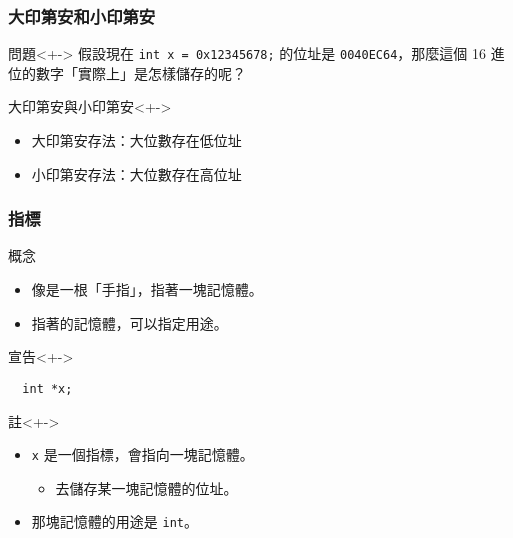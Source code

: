 \documentclass[utf8]{beamer}
\begin{document}
\begin{CJK}{UTF8}{bkai}
\begin{frame}[fragile]
  \frametitle{大印第安和小印第安}
  \begin{block}{問題}<+->
  假設現在 \lstinline{int x = 0x12345678;}{} 的位址是 \texttt{0040EC64}，那麼這個 16 進位的數字「實際上」是怎樣儲存的呢？
  \end{block}
  \begin{exampleblock}{大印第安與小印第安}<+->
    \begin{itemize}
    \item 大印第安存法：大位數存在\alert{低}位址
    \item<+-> 小印第安存法：大位數存在\alert{高}位址
    \end{itemize}
  \end{exampleblock}
\end{frame}

\begin{frame}[fragile]
  \frametitle{指標}
  \begin{block}{概念}
    \begin{itemize}[<+->]
    \item 像是一根「\alert{手指}」，指著一塊記憶體。
    \item<+-> 指著的記憶體，可以指定用途。
    \end{itemize}
  \end{block}
  \begin{alertblock}{宣告}<+->
    \begin{lstlisting}
  int *x;
    \end{lstlisting}
  \end{alertblock}
  \begin{exampleblock}{註}<+->
    \begin{itemize}
    \item \lstinline{x}{} 是一個指標，會指向一塊記憶體。
      \begin{itemize}[<+->]
      \item 去\alert{儲存}某一塊記憶體的\alert{位址}。
      \end{itemize}
    \item<+-> 那塊記憶體的用途是 \lstinline{int}{}。
    \end{itemize}
  \end{exampleblock}
\end{frame}


\end{CJK}
\end{document}
